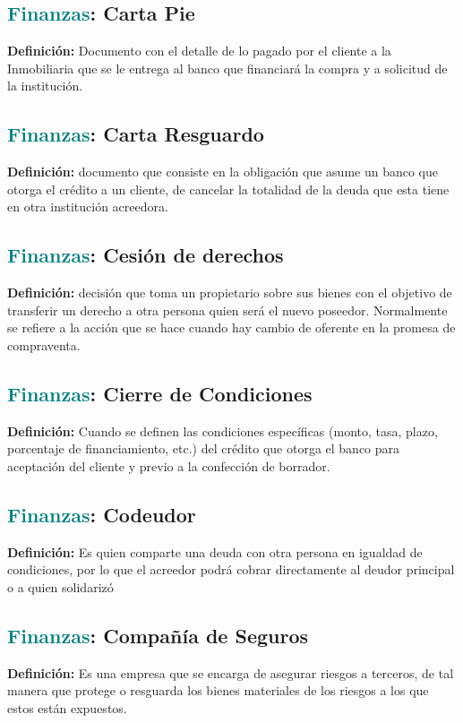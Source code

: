\documentclass[12pt]{article}
\begin{document}
\subsection{\textcolor{teal}{Finanzas}: Carta Pie}
\textbf{Definición:} Documento con el detalle de lo pagado por el cliente a la Inmobiliaria que se le entrega al banco que financiará la compra y a solicitud de la institución.
\subsection{\textcolor{teal}{Finanzas}: Carta Resguardo}
\textbf{Definición:} documento que consiste en la obligación que asume un banco que otorga el crédito a un cliente, de cancelar la totalidad de la deuda que esta tiene en otra institución acreedora.
\subsection{\textcolor{teal}{Finanzas}: Cesión de derechos}
\textbf{Definición:} decisión que toma un propietario sobre sus bienes con el objetivo de transferir un derecho a otra persona quien será el nuevo poseedor. Normalmente se refiere a la acción que se hace cuando hay cambio de oferente en la promesa de compraventa.
\subsection{\textcolor{teal}{Finanzas}: Cierre de Condiciones}
\textbf{Definición:} Cuando se definen las condiciones específicas (monto, tasa, plazo, porcentaje de financiamiento, etc.) del crédito que otorga el banco para aceptación del cliente y previo a la confección de borrador.
\subsection{\textcolor{teal}{Finanzas}: Codeudor}
\textbf{Definición:} Es quien comparte una deuda con otra persona en igualdad de condiciones, por lo que el acreedor podrá cobrar directamente al deudor principal o a quien solidarizó
\subsection{\textcolor{teal}{Finanzas}: Compañía de Seguros}
\textbf{Definición:} Es una empresa que se encarga de asegurar riesgos a terceros, de tal manera que protege o resguarda los bienes materiales de los riesgos a los que estos están expuestos.
\end{document}
